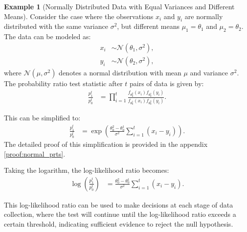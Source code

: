 \documentclass[magisterska, english]{pwr_wmat_praca_dyplomowa}
\theoremstyle{plain}
\numberwithin{theorem}{chapter}
\theoremstyle{definition}
\numberwithin{theorem}{chapter}
\newtheorem{example}[theorem]{Example}
\begin{document}
\begin{example}[Normally Distributed Data with Equal Variances and Different Means]
	
	
	Consider the case where the observations \(x_i\) and \(y_i\) are normally distributed with the same variance \(\sigma^2\), but different means \(\mu_1 = \theta_1\) and \(\mu_2 = \theta_2\). The data can be modeled as:
	\begin{align*}
		x_i &\sim \mathcal{N}(\theta_1, \sigma^2), \\
		y_i &\sim \mathcal{N}(\theta_2, \sigma^2),
	\end{align*}
	where \(\mathcal{N}(\mu, \sigma^2)\) denotes a normal distribution with mean \(\mu\) and variance \(\sigma^2\).
	The probability ratio test statistic after \(t\) pairs of data is given by:
	\begin{align*}
		\frac{p_1^t}{p_0^t} &= \prod_{i=1}^{t} \frac{f_{\theta_0^2}(x_i) f_{\theta_0^1}(y_i)}{f_{\theta_0^1}(x_i) f_{\theta_0^2}(y_i)}.
	\end{align*}

	This can be simplified to:
	\begin{align}\label{eqn:normal_prts}
		\frac{p_1^t}{p_0^t} &= \exp\left(\frac{\theta_0^2 - \theta_0^1}{\sigma^2} \sum_{i=1}^{t} (x_i - y_i)\right).
	\end{align}
	The detailed proof of this simplification is provided in the appendix \ref{proof:normal_prts}.
	
	Taking the logarithm, the log-likelihood ratio becomes:
	\begin{align*}
		\log \left(\frac{p_1^t}{p_0^t}\right) &= \frac{\theta_0^2 - \theta_0^1}{\sigma^2}  \sum_{i=1}^{t} (x_i - y_i).
	\end{align*}
	
	This log-likelihood ratio can be used to make decisions at each stage of data collection, where the test will continue until the log-likelihood ratio exceeds a certain threshold, indicating sufficient evidence to reject the null hypothesis.
\end{example}
\end{document}
